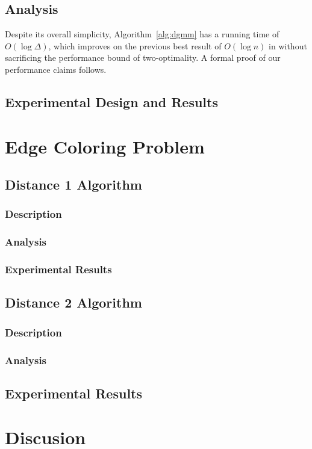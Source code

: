 \documentclass[twoside]{article}
\begin{document}
\subsection{Analysis}
\label{ssb:algorithms-dgmm-performance}

Despite its overall simplicity, Algorithm~\ref{alg:dgmm} has a running time of $O(\log \Delta)$, which improves on the previous best result of $O(\log n)$ in \cite{1582746} without sacrificing the performance bound of two-optimality. A formal proof of our performance claims follows.



\subsection{Experimental Design and Results}



\section{Edge Coloring Problem}
\label{sec:edge-coloring-problems}
\subsection{Distance 1 Algorithm}
\subsubsection{Description}


\subsubsection{Analysis}

\subsubsection{Experimental Results}

\subsection{Distance 2 Algorithm}
\subsubsection{Description}




\subsubsection{Analysis}

\subsection{Experimental Results}
\label{sub:experiment-erdren-direct}

\section{Discusion}



\end{document}
